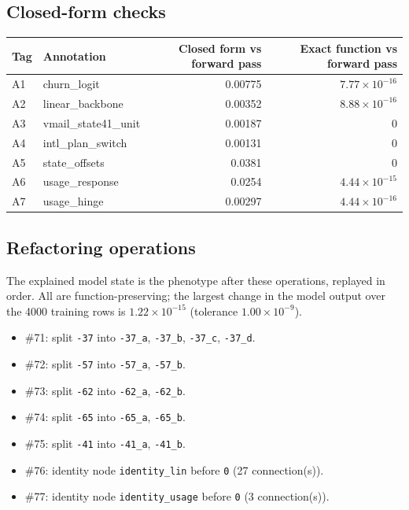 \begin{drafted}
\subsection{Closed-form checks}\label{app:churn100-s7-c1:closedform}
{\small\noindent\begin{tabularx}{\linewidth}{@{}lXrr@{}}
\toprule Tag & Annotation & Closed form vs forward pass & Exact function vs forward pass \\ \midrule
A1 & churn\_\allowbreak{}logit & 0.00775 & $7.77\times 10^{-16}$ \\
A2 & linear\_\allowbreak{}backbone & 0.00352 & $8.88\times 10^{-16}$ \\
A3 & vmail\_\allowbreak{}state41\_\allowbreak{}unit & 0.00187 & 0 \\
A4 & intl\_\allowbreak{}plan\_\allowbreak{}switch & 0.00131 & 0 \\
A5 & state\_\allowbreak{}offsets & 0.0381 & 0 \\
A6 & usage\_\allowbreak{}response & 0.0254 & $4.44\times 10^{-15}$ \\
A7 & usage\_\allowbreak{}hinge & 0.00297 & $4.44\times 10^{-16}$ \\
\bottomrule
\end{tabularx}\par}
\subsection{Refactoring operations}\label{app:churn100-s7-c1:operations}
The explained model state is the phenotype after these operations, replayed in order. All are function-preserving; the largest change in the model output over the 4000 training rows is $1.22\times 10^{-15}$ (tolerance $1.00\times 10^{-9}$).
\begin{itemize}
\item \#71: split \texttt{-37} into \texttt{-37\_\allowbreak{}a}, \texttt{-37\_\allowbreak{}b}, \texttt{-37\_\allowbreak{}c}, \texttt{-37\_\allowbreak{}d}.
\item \#72: split \texttt{-57} into \texttt{-57\_\allowbreak{}a}, \texttt{-57\_\allowbreak{}b}.
\item \#73: split \texttt{-62} into \texttt{-62\_\allowbreak{}a}, \texttt{-62\_\allowbreak{}b}.
\item \#74: split \texttt{-65} into \texttt{-65\_\allowbreak{}a}, \texttt{-65\_\allowbreak{}b}.
\item \#75: split \texttt{-41} into \texttt{-41\_\allowbreak{}a}, \texttt{-41\_\allowbreak{}b}.
\item \#76: identity node \texttt{identity\_\allowbreak{}lin} before \texttt{0} (27 connection(s)).
\item \#77: identity node \texttt{identity\_\allowbreak{}usage} before \texttt{0} (3 connection(s)).
\end{itemize}

\end{drafted}
